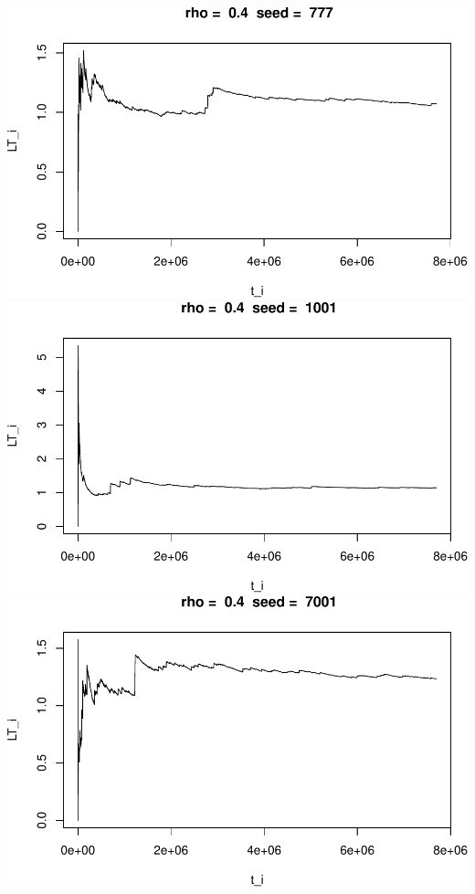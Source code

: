 \documentclass[]{article}
\begin{document}
\includegraphics{003_files/figure-latex/unnamed-chunk-13-7.pdf}
\includegraphics{003_files/figure-latex/unnamed-chunk-13-8.pdf}
\includegraphics{003_files/figure-latex/unnamed-chunk-13-9.pdf}
\end{document}
